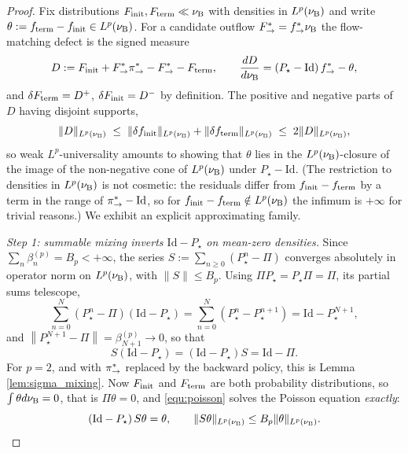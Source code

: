 \begin{proof}
Fix distributions $F_{\mathrm{init}},F_{\mathrm{term}}\ll\nu_{\mathrm{B}}$ with densities in $L^p(\nu_{\mathrm{B}})$ and write $\theta := f_{\mathrm{term}}-f_{\mathrm{init}}\in L^p(\nu_{\mathrm{B}})$. For a candidate outflow $F^*_{\rightarrow} = f^*_{\rightarrow}\nu_{\mathrm{B}}$ the flow-matching defect is the signed measure
\begin{equation}
    D := F_{\mathrm{init}} + F^*_{\rightarrow}\pi_{\rightarrow}^*-F^*_{\rightarrow}-F_{\mathrm{term}}, \qquad \frac{dD}{d\nu_{\mathrm{B}}} = \left(P_\star-\mathrm{Id}\right)f^*_{\rightarrow}-\theta,
\end{equation}
and $\delta F_{\mathrm{term}} = D^+$, $\delta F_{\mathrm{init}} = D^-$ by definition. The positive and negative parts of $D$ having disjoint supports,
\begin{equation}\label{equ:defect_equivalence}
    \|D\|_{L^p(\nu_{\mathrm{B}})}\;\leq\;\|\delta f_{\mathrm{init}}\|_{L^p(\nu_{\mathrm{B}})}+\|\delta f_{\mathrm{term}}\|_{L^p(\nu_{\mathrm{B}})}\;\leq\;2\|D\|_{L^p(\nu_{\mathrm{B}})},
\end{equation}
so weak $L^p$-universality amounts to showing that $\theta$ lies in the $L^p(\nu_{\mathrm{B}})$-closure of the image of the non-negative cone of $L^p(\nu_{\mathrm{B}})$ under $P_\star-\mathrm{Id}$. (The restriction to densities in $L^p(\nu_{\mathrm{B}})$ is not cosmetic: the residuals differ from $f_{\mathrm{init}}-f_{\mathrm{term}}$ by a term in the range of $\pi_{\rightarrow}^*-\mathrm{Id}$, so for $f_{\mathrm{init}}-f_{\mathrm{term}}\notin L^p(\nu_{\mathrm{B}})$ the infimum is $+\infty$ for trivial reasons.) We exhibit an explicit approximating family.

\emph{Step 1: summable mixing inverts $\mathrm{Id}-P_\star$ on mean-zero densities.} Since $\sum_n\beta^{(p)}_n = B_p<+\infty$, the series $S:=\sum_{n\geq0}\left(P^n_\star-\Pi\right)$ converges absolutely in operator norm on $L^p(\nu_{\mathrm{B}})$, with $\|S\|\leq B_p$. Using $\Pi P_\star = P_\star\Pi = \Pi$, its partial sums telescope,
\begin{equation}
    \sum_{n=0}^N\left(P^n_\star-\Pi\right)\left(\mathrm{Id}-P_\star\right) = \sum_{n=0}^N\left(P^n_\star-P^{n+1}_\star\right) = \mathrm{Id}-P^{N+1}_\star,
\end{equation}
and $\left\|P^{N+1}_\star-\Pi\right\| = \beta^{(p)}_{N+1}\rightarrow0$, so that
\begin{equation}\label{equ:poisson}
    S\left(\mathrm{Id}-P_\star\right) = \left(\mathrm{Id}-P_\star\right)S = \mathrm{Id}-\Pi .
\end{equation}
For $p=2$, and with $\pi_{\rightarrow}^*$ replaced by the backward policy, this is Lemma \ref{lem:sigma_mixing}. Now $F_{\mathrm{init}}$ and $F_{\mathrm{term}}$ are both probability distributions, so $\int\theta d\nu_{\mathrm{B}} = 0$, that is $\Pi\theta=0$, and \eqref{equ:poisson} solves the Poisson equation \emph{exactly}:
\begin{equation}\label{equ:poisson_solved}
    \left(\mathrm{Id}-P_\star\right)S\theta = \theta,\qquad \|S\theta\|_{L^p(\nu_{\mathrm{B}})}\leq B_p\|\theta\|_{L^p(\nu_{\mathrm{B}})} .
\end{equation}


\end{proof}
